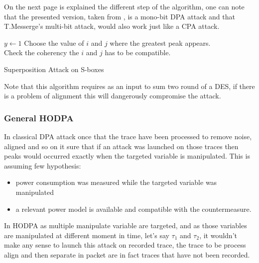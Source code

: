 On the next page is explained the different step of the algorithm, one can note that 
the presented version, taken from \cite{fse-2003-akkar}, is a mono-bit DPA attack and 
that T.Messerge's multi-bit attack, would also work just like a CPA attack.


			\begin{algorithm}[h]
				$y \leftarrow 1$	\;	
					Choose the value of $i$ and $j$ where the greatest peak appears.\\
					Check the coherency the $i$ and $j$ has to be compatible. 	\;							 
				\;
				\caption{Superposition Attack on S-boxes}
			\end{algorithm}

Note that this algorithm requires as an input to sum two round of a DES, if there is 
a problem of alignment this will dangerously compromise the attack.


\newpage
\subsubsection{General HODPA}
\label{eneral_HODPA}

	
In classical DPA attack once that the trace have been processed to remove noise, aligned and so on
it sure that if an attack was launched on those traces then peaks would occurred exactly when the 
targeted variable is manipulated.  This is assuming few hypothesis:
\begin{itemize}
	\item power consumption was measured while the targeted variable was manipulated
	\item a relevant power model is available and compatible with the countermeasure.
\end{itemize}

In HODPA as multiple manipulate variable are targeted, and as those variables
are manipulated at different moment in time, let's say $\tau_1$ and $\tau_2$,  
it wouldn't make any sense to launch this attack on recorded trace, 
the trace to be process align and then separate in packet are in 
fact traces that have not been recorded.
\vspace{3mm}


